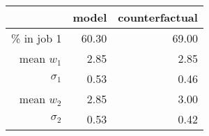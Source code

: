 \begin{table}[!h]
\centering
 \caption{} 
\begin{tabular}{rrr}
\toprule
 & \textbf{model} & \textbf{counterfactual}\\
\midrule
\% in job 1 & 60.30 & 69.00\\
mean $w_1$ & 2.85 & 2.85\\
$\sigma_1$ & 0.53 & 0.46\\
mean $w_2$ & 2.85 & 3.00\\
$\sigma_2$ & 0.53 & 0.42\\
\bottomrule
\end{tabular}
\end{table}